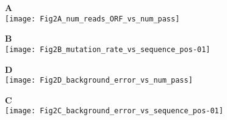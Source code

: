 \documentclass[10pt]{article}
\begin{document}
\begin{minipage}[t]{.32\linewidth}
  \textbf{A}\\
  \texttt{[image: Fig2A\_num\_reads\_ORF\_vs\_num\_pass]}
\end{minipage}\hfill
\begin{minipage}[t]{.64\linewidth}
  \textbf{B}\\
  \texttt{[image: Fig2B\_mutation\_rate\_vs\_sequence\_pos-01]}
\end{minipage}

\begin{minipage}[t]{0.32\linewidth}
  \textbf{D}\\
  \texttt{[image: Fig2D\_background\_error\_vs\_num\_pass]}
\end{minipage}\hfill
\begin{minipage}[t]{.64\linewidth}
  \textbf{C}\\
  \texttt{[image: Fig2C\_background\_error\_vs\_sequence\_pos-01]}
\end{minipage}
\end{document}
